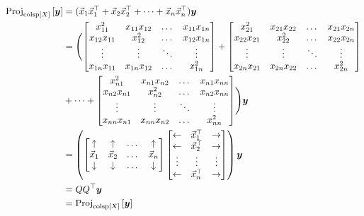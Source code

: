 \documentclass[12pt]{article}
\begin{document}
\begin{enumerate}
$$ \begin{aligned} \text{Proj}_{\text{colsp}\left[X\right]}\left[\boldsymbol{y}\right] &= (\vec{x}_1\vec{x}_1^\top + \vec{x}_2\vec{x}_2^\top + \dots + \vec{x}_n\vec{x}_n^\top)\boldsymbol{y} \\ &= \Biggl(\begin{bmatrix} x_{11}^2 & x_{11}x_{12} & \dots & x_{11}x_{1n} \\ x_{12}x_{11} & x_{12}^2 & \dots & x_{12}x_{1n} \\ \vdots & \vdots & \ddots & \vdots \\ x_{1n}x_{11} & x_{1n}x_{12} & \dots & x_{1n}^2 \end{bmatrix} + \begin{bmatrix} x_{21}^2 & x_{21}x_{22} & \dots & x_{21}x_{2n} \\ x_{22}x_{21} & x_{22}^2 & \dots & x_{22}x_{2n} \\ \vdots & \vdots & \ddots & \vdots \\ x_{2n}x_{21} & x_{2n}x_{22} & \dots & x_{2n}^2 \end{bmatrix} \\ &+ \dots + \begin{bmatrix} x_{n1}^2 & x_{n1}x_{n2} & \dots & x_{n1}x_{nn} \\ x_{n2}x_{n1} & x_{n2}^2 & \dots & x_{n2}x_{nn} \\ \vdots & \vdots & \ddots & \vdots \\ x_{nn}x_{n1} & x_{nn}x_{n2} & \dots & x_{nn}^2 \end{bmatrix}\Biggr)\boldsymbol{y} \\ &= \left( \begin{bmatrix} \uparrow & \uparrow & \dots & \uparrow \\ \vec{x}_1 & \vec{x}_2 & \dots & \vec{x}_n \\ \downarrow & \downarrow & \dots & \downarrow \end{bmatrix} \begin{bmatrix} \leftarrow & \vec{x}_1^\top & \rightarrow \\ \leftarrow & \vec{x}_2^\top & \rightarrow \\ \vdots & \vdots & \vdots \\ \leftarrow & \vec{x}_n^\top & \rightarrow \end{bmatrix}\right)\boldsymbol{y} \\ &= QQ^\top\boldsymbol{y} \\ &= \text{Proj}_{\text{colsp}\left[X\right]}\left[\boldsymbol{y}\right] \end{aligned} $$ 


\end{enumerate}
\end{document}

